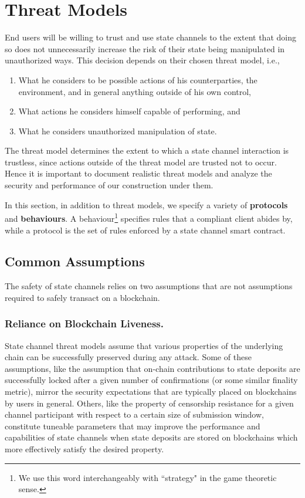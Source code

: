 \documentclass[prb,floatfix,reprint,nofootinbib,amsmath,amssymb,epsfig,pre,floats,letterpaper,groupedaffiliation,tightenlines,allcolors=blue,11pt]{revtex4}
\theoremstyle{definition}
\theoremstyle{definition}
\theoremstyle{definition}
\begin{document}
\section{Threat Models}
\label{sec:threat}

End users will be willing to trust and use state channels to the extent that doing so does not unnecessarily increase the risk of their state being manipulated in unauthorized ways. This decision depends on their chosen threat model, i.e.,

\begin{enumerate}
    \setlength\itemsep{0em}
    \item What he considers to be possible actions of his counterparties, the environment, and in general anything outside of his own control,
    \item What actions he considers himself capable of performing, and
    \item What he considers unauthorized manipulation of state.
\end{enumerate}

The threat model determines the extent to which a state channel interaction is trustless, since actions outside of the threat model are trusted not to occur. Hence it is important to document realistic threat models and analyze the security and performance of our construction under them.

In this section, in addition to threat models, we specify a variety of \textbf{protocols} and \textbf{behaviours}. A behaviour\footnote{We use this word interchangeably with ``strategy" in the game theoretic sense.} specifies rules that a compliant client abides by, while a protocol is the set of rules enforced by a state channel smart contract.

\subsection{Common Assumptions}

The safety of state channels relies on two assumptions that are not assumptions required to safely transact on a blockchain.

\subsubsection{Reliance on Blockchain Liveness.} State channel threat models assume that various properties of the underlying chain can be successfully preserved during any attack. Some of these assumptions, like the assumption that on-chain contributions to state deposits are successfully locked after a given number of confirmations (or some similar finality metric), mirror the security expectations that are typically placed on blockchains by users in general. Others, like the property of censorship resistance for a given channel participant with respect to a certain size of submission window, constitute tuneable parameters that may improve the performance and capabilities of state channels when state deposits are stored on blockchains which more effectively satisfy the desired property.
\end{document}
